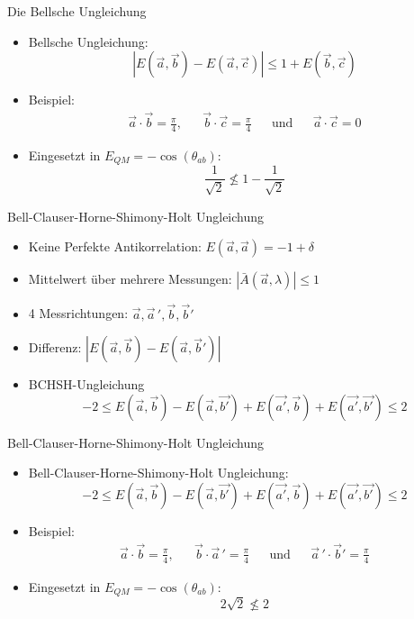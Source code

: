 \documentclass{beamer}
\begin{document}
\begin{frame}{Die Bellsche Ungleichung}
    \begin{itemize}
        \item Bellsche Ungleichung:
            \[
                \left| E(\vec{a},\vec{b}) - E(\vec{a},\vec{c}) \right| 
                \leq
                1 + E(\vec{b},\vec{c})
            \]
        \item Beispiel:
            \begin{align*}
                \vec{a}\cdot\vec{b} = \frac{\pi}{4}, &&
                \vec{b}\cdot\vec{c} = \frac{\pi}{4} &&
                \text{und} &&
                \vec{a}\cdot\vec{c} = 0
            \end{align*}
        \item Eingesetzt in $E_{QM} = -\cos(\theta_{ab})$:
            \[
                \frac{1}{\sqrt{2}} \nleq 1 - \frac{1}{\sqrt{2}}
            \]
    \end{itemize}
\end{frame}
\begin{frame}{Bell-Clauser-Horne-Shimony-Holt Ungleichung}
    \begin{itemize}[<+->]
        \item Keine Perfekte Antikorrelation: 
                $E(\vec{a},\vec{a}) = -1+\delta$
        \item Mittelwert \"uber mehrere Messungen: 
                $\left|\bar{A}(\vec{a},\lambda)\right| \leq 1$
        \item 4 Messrichtungen:
                $\vec{a},\vec{a}\,',\vec{b},\vec{b}'$
        \item Differenz:
                $\left| E(\vec{a},\vec{b}) - E(\vec{a},\vec{b}') \right|$
        \item BCHSH-Ungleichung
                \[
                    -2 \leq 
                    E(\vec{a},\vec{b}) - E(\vec{a},\vec{b'}) + E(\vec{a'},\vec{b}) + E(\vec{a'},\vec{b'})
                    \leq 2
                \]
    \end{itemize}
\end{frame}
\begin{frame}{Bell-Clauser-Horne-Shimony-Holt Ungleichung}
    \begin{itemize}
        \item Bell-Clauser-Horne-Shimony-Holt Ungleichung:
            \[
                -2 \leq 
                E(\vec{a},\vec{b}) - E(\vec{a},\vec{b'}) + E(\vec{a'},\vec{b}) + E(\vec{a'},\vec{b'})
                \leq 2
            \]
        \item Beispiel:
            \begin{align*}
                \vec{a}\cdot\vec{b} = \frac{\pi}{4}, &&
                \vec{b}\cdot\vec{a}\,' = \frac{\pi}{4} &&
                \text{und} &&
                \vec{a}\,'\cdot\vec{b}' = \frac{\pi}{4}
            \end{align*}
        \item Eingesetzt in $E_{QM} = -\cos(\theta_{ab})$:
            \[
                2\sqrt{2} \nleq 2
            \]
    \end{itemize}
\end{frame}
\end{document}
